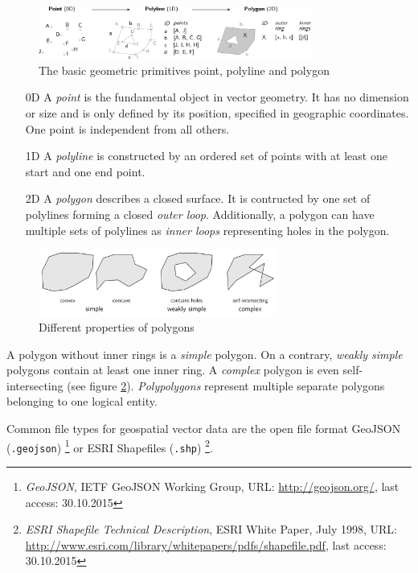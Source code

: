 \begin{figure}[H]
  \vspace{1em}
  \centering
  \includegraphics[width=0.8\textwidth]{graphics/basics/hgis/geometric_primitives}
  \caption{The basic geometric primitives point, polyline and polygon}
  \label{fig:geometric_primitives}
\end{figure}

\begin{enumerate}
  \item[0D] A \emph{point} is the fundamental object in vector geometry. It has no dimension or size and is only defined by its position, specified in geographic coordinates. One point is independent from all others.
  \item[1D] A \emph{polyline} is constructed by an ordered set of points with at least one start and one end point.
  \item[2D] A \emph{polygon} describes a closed surface. It is contructed by one set of polylines forming a closed \emph{outer loop}. Additionally, a polygon can have multiple sets of polylines as \emph{inner loops} representing holes in the polygon.
\end{enumerate}

\begin{figure}[H]
  \centering
  \includegraphics[width=0.7\textwidth]{graphics/basics/hgis/polygon_properties}
  \caption{Different properties of polygons}
  \label{fig:polygon_properties}
\end{figure}

A polygon without inner rings is a \emph{simple} polygon. On a contrary, \emph{weakly simple} polygons contain at least one inner ring. A \emph{complex} polygon is even self-intersecting (see figure \ref{fig:polygon_properties}). \emph{Polypolygons} represent multiple separate polygons belonging to one logical entity.

Common file types for geospatial vector data are the open file format GeoJSON (\texttt{.geojson})
\footnote{
  \emph{GeoJSON},
  IETF GeoJSON Working Group,
  URL: \url{http://geojson.org/},
  last access: 30.10.2015
}
or ESRI Shapefiles (\texttt{.shp})
\footnote{
  \emph{ESRI Shapefile Technical Description},
  ESRI White Paper, July 1998,
  URL: \url{http://www.esri.com/library/whitepapers/pdfs/shapefile.pdf},
  last access: 30.10.2015
}.

